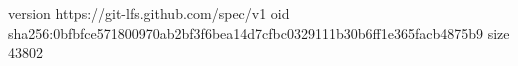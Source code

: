 version https://git-lfs.github.com/spec/v1
oid sha256:0bfbfce571800970ab2bf3f6bea14d7cfbc0329111b30b6ff1e365facb4875b9
size 43802
